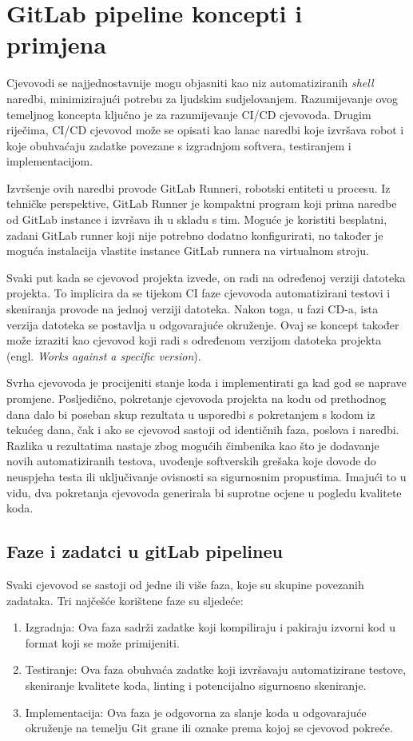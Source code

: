 \documentclass[a4paper,12pt,oneside]{article}
\begin{document}
\section{GitLab pipeline koncepti i primjena}

Cjevovodi se najjednostavnije mogu objasniti kao niz automatiziranih \textit{shell} naredbi, minimizirajući potrebu za ljudskim sudjelovanjem. Razumijevanje ovog temeljnog koncepta ključno je za razumijevanje CI/CD cjevovoda. Drugim riječima, CI/CD cjevovod može se opisati kao lanac naredbi koje izvršava robot i koje obuhvaćaju zadatke povezane s izgradnjom softvera, testiranjem i implementacijom.

Izvršenje ovih naredbi provode GitLab Runneri, robotski entiteti u procesu. Iz tehničke perspektive, GitLab Runner je kompaktni program koji prima naredbe od GitLab instance i izvršava ih u skladu s tim. Moguće je koristiti besplatni, zadani GitLab runner koji nije potrebno dodatno konfigurirati, no također je moguća instalacija vlastite instance GitLab runnera na virtualnom stroju.

Svaki put kada se cjevovod projekta izvede, on radi na određenoj verziji datoteka projekta. To implicira da se tijekom CI faze cjevovoda automatizirani testovi i skeniranja provode na jednoj verziji datoteka. Nakon toga, u fazi CD-a, ista verzija datoteka se postavlja u odgovarajuće okruženje. Ovaj se koncept također može izraziti kao cjevovod koji radi s određenom verzijom datoteka projekta (engl. \textit{Works against a specific version}).

Svrha cjevovoda je procijeniti stanje koda i implementirati ga kad god se naprave promjene. Posljedično, pokretanje cjevovoda projekta na kodu od prethodnog dana dalo bi poseban skup rezultata u usporedbi s pokretanjem s kodom iz tekućeg dana, čak i ako se cjevovod sastoji od identičnih faza, poslova i naredbi. Razlika u rezultatima nastaje zbog mogućih čimbenika kao što je dodavanje novih automatiziranih testova, uvođenje softverskih grešaka koje dovode do neuspjeha testa ili uključivanje ovisnosti sa sigurnosnim propustima. Imajući to u vidu, dva pokretanja cjevovoda generirala bi suprotne ocjene u pogledu kvalitete koda.

\subsection{Faze i zadatci u gitLab pipelineu}
Svaki cjevovod se sastoji od jedne ili više faza, koje su skupine povezanih zadataka. Tri najčešće korištene faze su sljedeće:
\begin{enumerate}
\item Izgradnja: Ova faza sadrži zadatke koji kompiliraju i pakiraju izvorni kod u format koji se može primijeniti.

\item Testiranje: Ova faza obuhvaća zadatke koji izvršavaju automatizirane testove, skeniranje kvalitete koda, linting i potencijalno sigurnosno skeniranje.

\item Implementacija: Ova faza je odgovorna za slanje koda u odgovarajuće okruženje na temelju Git grane ili oznake prema kojoj se cjevovod pokreće. 
\end{enumerate}
\end{document}
